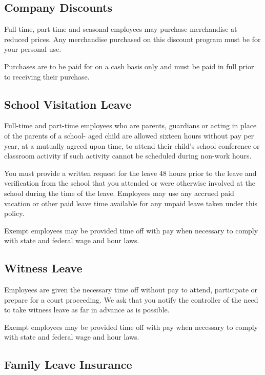 \documentclass{book}
\begin{document}
\subsection{Company Discounts}

Full-time, part-time and seasonal employees may purchase merchandise at reduced prices. Any merchandise purchased on this discount program must be for your personal use.

Purchases are to be paid for on a cash basis only and must be paid in full prior to receiving their purchase.

\subsection{School Visitation Leave}

Full-time and part-time employees who are parents, guardians or acting in place of the parents of a school- aged child are allowed sixteen hours without pay per year, at a mutually agreed upon time, to attend their child's school conference or classroom activity if such activity cannot be scheduled during non-work hours.

You must provide a written request for the leave 48 hours prior to the leave and verification from the school that you attended or were otherwise involved at the school during the time of the leave. Employees may use any accrued paid vacation or other paid leave time available for any unpaid leave taken under this policy.

Exempt employees may be provided time off with pay when necessary to comply with state and federal wage and hour laws.

\subsection{Witness Leave}

Employees are given the necessary time off without pay to attend, participate or prepare for a court proceeding. We ask that you notify the controller of the need to take witness leave as far in advance as is possible.

Exempt employees may be provided time off with pay when necessary to comply with state and federal wage and hour laws.

\subsection{Family Leave Insurance}
\end{document}
